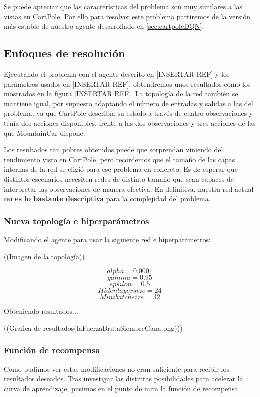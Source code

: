Se puede apreciar que las características del problema son muy similares a las vistas en CartPole. Por ello para resolver este problema partiremos de la versión más estable de nuestro agente desarrollado en \ref{sec:cartpoleDQN}.


\subsection{Enfoques de resolución}

Ejecutando el problema con el agente descrito en [INSERTAR REF] y los parámetros usados en [INSERTAR REF], obtendremos unos resultados como los mostrados en la figura [INSERTAR REF]. La topología de la red también se mantiene igual, por supuesto adaptando el número de entradas y salidas a las del problema; ya que CartPole describía su estado a través de cuatro observaciones y tenía dos acciones disponibles, frente a las dos observaciones y tres acciones de las que MountainCar dispone.

Los resultados tan pobres obtenidos puede que sorprendan viniendo del rendimiento visto en CartPole, pero recordemos que el tamaño de las capas internas de la red se eligió para ese problema en concreto. Es de esperar que distintos escenarios necesiten redes de distinto tamaño que sean capaces de interpretar las observaciones de manera efectiva. En definitiva, nuestra red actual \textbf{no es lo bastante descriptiva} para la complejidad del problema.

\subsubsection*{Nueva topología e hiperparámetros}
Modificando el agente para usar la siguiente red e hiperparámetros:

((Imagen de la topología))

$$ alpha = 0.0001$$
$$ gamma = 0.95$$
$$ epsilon = 0.5$$
$$ Hiden layer size = 24$$
$$ Minibatch size = 32 $$

Obteniendo resultados... 

((Grafica de resultados(laFuerzaBrutaSiempreGana.png)))

\subsubsection*{Función de recompensa}
Como pudimos ver estas modificaciones no eran suficiente para recibir los resultados deseados.
Tras investigar las distintas posibilidades para acelerar la curva de aprendizaje, pusimos en el punto de mira la función de recompensa. 

